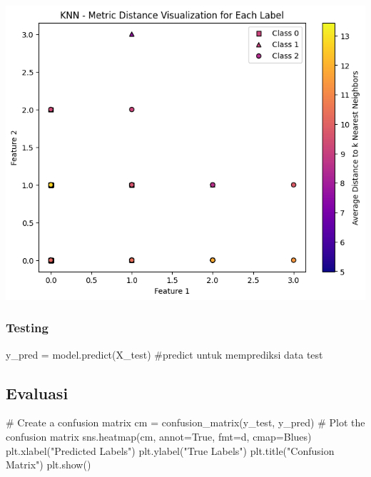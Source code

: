 \documentclass[
  letterpaper,
  DIV=11,
  numbers=noendperiod]{scrreprt}
\newenvironment{Shaded}{\begin{snugshade}}{\end{snugshade}}
\newcommand{\CommentTok}[1]{\textcolor[rgb]{0.37,0.37,0.37}{#1}}
\newcommand{\NormalTok}[1]{\textcolor[rgb]{0.00,0.23,0.31}{#1}}
\newcommand{\OperatorTok}[1]{\textcolor[rgb]{0.37,0.37,0.37}{#1}}
\newcommand{\StringTok}[1]{\textcolor[rgb]{0.13,0.47,0.30}{#1}}
\newcommand{\VariableTok}[1]{\textcolor[rgb]{0.07,0.07,0.07}{#1}}
\begin{document}
\includegraphics{Asset/plt_sift_knndistance.png}

\hypertarget{testing}{%
\subsubsection*{Testing}\label{testing}}

\begin{Shaded}
\begin{Highlighting}[]
\NormalTok{y\_pred }\OperatorTok{=}\NormalTok{ model.predict(X\_test) }\CommentTok{\#predict untuk memprediksi data test}
\end{Highlighting}
\end{Shaded}

\hypertarget{evaluasi-1}{%
\subsection*{Evaluasi}\label{evaluasi-1}}

\begin{Shaded}
\begin{Highlighting}[]
\CommentTok{\# Create a confusion matrix}
\NormalTok{cm }\OperatorTok{=}\NormalTok{ confusion\_matrix(y\_test, y\_pred)}
\CommentTok{\# Plot the confusion matrix}
\NormalTok{sns.heatmap(cm, annot}\OperatorTok{=}\VariableTok{True}\NormalTok{, fmt}\OperatorTok{=}\StringTok{\textquotesingle{}d\textquotesingle{}}\NormalTok{, cmap}\OperatorTok{=}\StringTok{\textquotesingle{}Blues\textquotesingle{}}\NormalTok{)}
\NormalTok{plt.xlabel(}\StringTok{"Predicted Labels"}\NormalTok{)}
\NormalTok{plt.ylabel(}\StringTok{"True Labels"}\NormalTok{)}
\NormalTok{plt.title(}\StringTok{"Confusion Matrix"}\NormalTok{)}
\NormalTok{plt.show()}
\end{Highlighting}
\end{Shaded}
\end{document}
